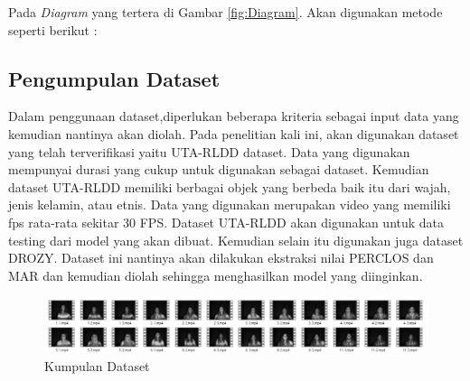 Pada \emph{Diagram} yang tertera di Gambar \ref{fig:Diagram}. Akan digunakan metode seperti berikut :

\subsection{Pengumpulan Dataset}

Dalam penggunaan dataset,diperlukan beberapa kriteria sebagai input data yang kemudian nantinya akan diolah. Pada penelitian kali ini, akan digunakan dataset yang telah terverifikasi yaitu UTA-RLDD dataset. Data yang digunakan mempunyai durasi yang cukup untuk digunakan sebagai dataset. Kemudian dataset UTA-RLDD memiliki berbagai objek yang berbeda baik itu dari wajah, jenis kelamin, atau etnis. Data yang digunakan merupakan video yang memiliki fps rata-rata sekitar 30 FPS. Dataset UTA-RLDD akan digunakan untuk data testing dari model yang akan dibuat. Kemudian selain itu digunakan juga dataset DROZY. Dataset ini nantinya akan dilakukan ekstraksi nilai PERCLOS dan MAR dan kemudian diolah sehingga menghasilkan model yang diinginkan. 


\begin{figure} [H] \centering
  \includegraphics[scale=0.4]{gambar/3_1_4.jpg}
  \caption{Kumpulan Dataset}
  \label{fig:DatasetPic}
\end{figure}

